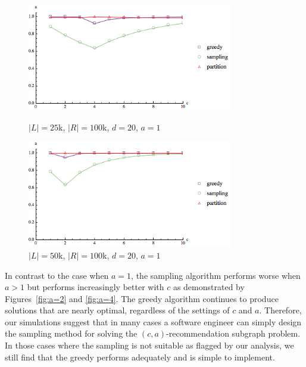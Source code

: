 \begin{figure}[t]
\centering
\begin{minipage}[h]{0.48\textwidth}
\centering
\includegraphics[width=0.8\textwidth]{images/l=25000,r=100000_Greedy_vs_Naive.png}
\caption{$|L|=25$k, $|R|=100$k, $d=20$, $a=1$}\label{fig:a=1:1}
\end{minipage}
\hspace{0cm}
\begin{minipage}[h]{0.48\textwidth}
\centering
\includegraphics[width=0.8\textwidth]{images/l=50000,r=100000_Greedy_vs_Naive.png}
\caption{$|L|=50$k, $|R|=100$k, $d=20$, $a=1$}\label{fig:a=1:2}
\end{minipage}
\vspace{-0.2in}
\end{figure}



\vs
In contrast to the case when $a=1$, the sampling algorithm performs
worse when $a>1$ but performs increasingly better with $c$ as
demonstrated by Figures~\ref{fig:a=2} and \ref{fig:a=4}. The greedy
algorithm continues to produce solutions that are nearly optimal,
regardless of the settings of $c$ and $a$. Therefore, our simulations
suggest that in many cases a software engineer can simply design the
sampling method for solving the $(c, a)$-recommendation subgraph
problem. In those cases where the sampling is not suitable as flagged by our analysis, 
we still find that the greedy performs adequately and is simple to implement.


